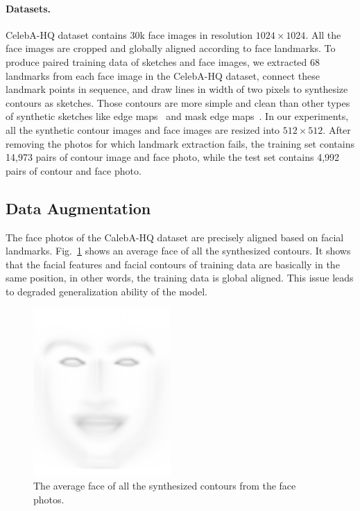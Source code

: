 \documentclass[10pt,twocolumn,letterpaper]{article}
\begin{document}
\paragraph{Datasets.}
CelebA-HQ dataset contains 30k face images in resolution $1024\times1024$. All the face images are cropped and globally aligned according to face landmarks.
To produce paired training data of sketches and face images, we extracted 68 landmarks from each face image in the CelebA-HQ dataset, connect these landmark points in sequence, and draw lines in width of two pixels to synthesize contours as sketches.
Those contours are more simple and clean than other types of synthetic sketches like edge maps~\cite{csagan} and mask edge maps~\cite{maskgan}. 
In our experiments, all the synthetic contour images and face images are resized into $512\times512$. 
After removing the photos for which landmark extraction fails, the training set contains 14,973 pairs of contour image and face photo, while the test set contains 4,992 pairs of contour and face photo. 

\subsection{Data Augmentation}\label{sec:augmentation} 
The face photos of the CalebA-HQ dataset are precisely aligned based on facial landmarks. Fig.~\ref{fig:average_face} shows an average face of all the synthesized contours. 
It shows that the facial features and facial contours of training data are basically in the same position, in other words, the training data is global aligned. 
This issue leads to degraded generalization ability of the model.
 
\begin{figure}[htb]
	\centering
	\includegraphics[width=0.18 \textwidth]{average_face.png}
	\caption{The average face of all the synthesized contours from the face photos. }
	\label{fig:average_face}
\end{figure}
\end{document}
